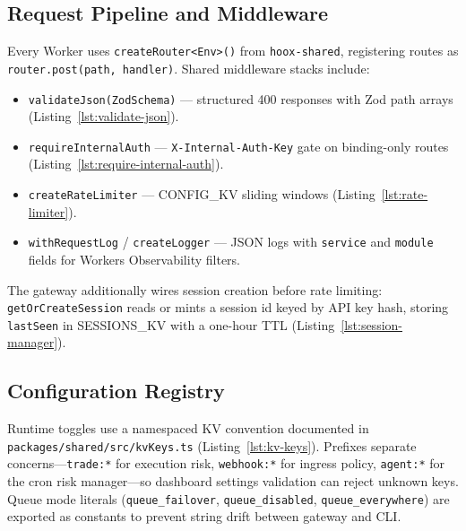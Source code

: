 \subsection{Request Pipeline and Middleware}

Every Worker uses \texttt{createRouter<Env>()} from \texttt{hoox-shared}, registering routes as \texttt{router.post(path, handler)}. Shared middleware stacks include:

\begin{itemize}
  \item \texttt{validateJson(ZodSchema)} --- structured 400 responses with Zod path arrays (Listing~\ref{lst:validate-json}).
  \item \texttt{requireInternalAuth} --- \texttt{X-Internal-Auth-Key} gate on binding-only routes (Listing~\ref{lst:require-internal-auth}).
  \item \texttt{createRateLimiter} --- CONFIG\_KV sliding windows (Listing~\ref{lst:rate-limiter}).
  \item \texttt{withRequestLog} / \texttt{createLogger} --- JSON logs with \texttt{service} and \texttt{module} fields for Workers Observability filters.
\end{itemize}

The gateway additionally wires session creation before rate limiting: \texttt{getOrCreateSession} reads or mints a session id keyed by API key hash, storing \texttt{lastSeen} in SESSIONS\_KV with a one-hour TTL (Listing~\ref{lst:session-manager}).


\subsection{Configuration Registry}

Runtime toggles use a namespaced KV convention documented in \texttt{packages/shared/src/kvKeys.ts} (Listing~\ref{lst:kv-keys}). Prefixes separate concerns---\texttt{trade:*} for execution risk, \texttt{webhook:*} for ingress policy, \texttt{agent:*} for the cron risk manager---so dashboard settings validation can reject unknown keys. Queue mode literals (\texttt{queue\_failover}, \texttt{queue\_disabled}, \texttt{queue\_everywhere}) are exported as constants to prevent string drift between gateway and CLI.


